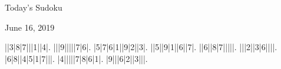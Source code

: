 \documentclass{article}
\begin{document}
\begin{center}
\Huge{Today's Sudoku}
\end{center}
\begin{center}
\Large{June 16, 2019}
\end{center}
\begin{sudoku}
||3|8|7|||1||4|.
|||9|||||7|6|.
|5|7|6|1||9|2||3|.
||5||9|1||6||7|.
||6||8|7|||||.
|||2||3|6||||.
|6|8||4|5|1|7|||.
|4|||||7|8|6|1|.
|9|||6|2||3|||.
\end{sudoku}
\end{document}
